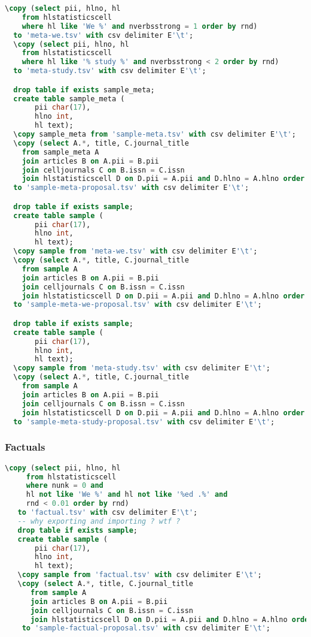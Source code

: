\documentclass[a4paper,11pt]{report}
\begin{document}
\begin{lstlisting}[language=SQL]
  \copy (select pii, hlno, hl
    from hlstatisticscell
    where hl like 'We %' and nverbsstrong = 1 order by rnd)
  to 'meta-we.tsv' with csv delimiter E'\t';
  \copy (select pii, hlno, hl
    from hlstatisticscell
    where hl like '% study %' and nverbsstrong < 2 order by rnd)
  to 'meta-study.tsv' with csv delimiter E'\t';

  drop table if exists sample_meta;
  create table sample_meta (
       pii char(17),
       hlno int,
       hl text);
  \copy sample_meta from 'sample-meta.tsv' with csv delimiter E'\t';
  \copy (select A.*, title, C.journal_title
    from sample_meta A
    join articles B on A.pii = B.pii
    join celljournals C on B.issn = C.issn
    join hlstatisticscell D on D.pii = A.pii and D.hlno = A.hlno order by D.rnd)
  to 'sample-meta-proposal.tsv' with csv delimiter E'\t';

  drop table if exists sample;
  create table sample (
       pii char(17),
       hlno int,
       hl text);
  \copy sample from 'meta-we.tsv' with csv delimiter E'\t';
  \copy (select A.*, title, C.journal_title
    from sample A
    join articles B on A.pii = B.pii
    join celljournals C on B.issn = C.issn
    join hlstatisticscell D on D.pii = A.pii and D.hlno = A.hlno order by D.rnd)
  to 'sample-meta-we-proposal.tsv' with csv delimiter E'\t';

  drop table if exists sample;
  create table sample (
       pii char(17),
       hlno int,
       hl text);
  \copy sample from 'meta-study.tsv' with csv delimiter E'\t';
  \copy (select A.*, title, C.journal_title
    from sample A
    join articles B on A.pii = B.pii
    join celljournals C on B.issn = C.issn
    join hlstatisticscell D on D.pii = A.pii and D.hlno = A.hlno order by D.rnd)
  to 'sample-meta-study-proposal.tsv' with csv delimiter E'\t';
\end{lstlisting}

\subsubsection*{Factuals}
\begin{lstlisting}[language=SQL]
  \copy (select pii, hlno, hl
     from hlstatisticscell
     where nunk = 0 and
     hl not like 'We %' and hl not like '%ed .%' and
     rnd < 0.01 order by rnd)
   to 'factual.tsv' with csv delimiter E'\t';
   -- why exporting and importing ? wtf ?
   drop table if exists sample;
   create table sample (
       pii char(17),
       hlno int,
       hl text);
   \copy sample from 'factual.tsv' with csv delimiter E'\t';
   \copy (select A.*, title, C.journal_title
      from sample A
      join articles B on A.pii = B.pii
      join celljournals C on B.issn = C.issn
      join hlstatisticscell D on D.pii = A.pii and D.hlno = A.hlno order by D.rnd)
    to 'sample-factual-proposal.tsv' with csv delimiter E'\t';
\end{lstlisting}
\end{document}
